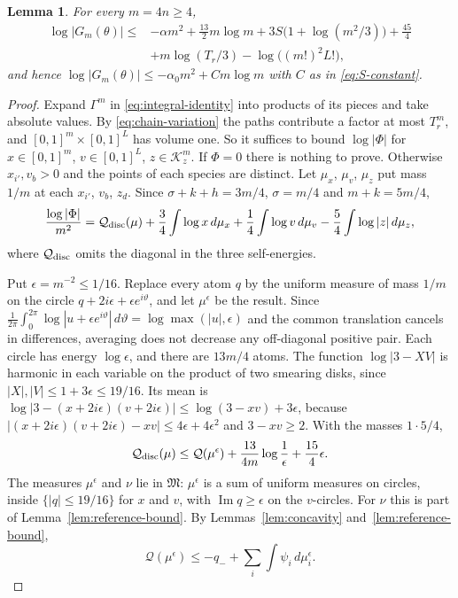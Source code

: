 \documentclass{amsart}
\newtheorem{lemma}{Lemma}[section]
\numberwithin{equation}{section}
\numberwithin{table}{section}
\begin{document}
\begin{lemma}\label{lem:analytic-bound}
For every $m=4n\ge4$,
\begin{equation}\label{eq:analytic-full}
\begin{split}
 \log|G_m(\theta)|\le{}&-\alpha m^2+\tfrac{13}{2}m\log m
   +3S\bigl(1+\log(m^2/3)\bigr)+\tfrac{45}{4}\\
  &+m\log(T_r/3)-\log\bigl((m!)^2L!\bigr),
\end{split}
\end{equation}
and hence $\log|G_m(\theta)|\le-\alpha_0m^2+Cm\log m$ with $C$ as in
\eqref{eq:S-constant}.
\end{lemma}
\begin{proof}
Expand $\Gamma^m$ in \eqref{eq:integral-identity} into products of its
pieces and take absolute values. By \eqref{eq:chain-variation} the paths
contribute a factor at most $T_r^m$, and $[0,1]^m\times[0,1]^L$ has volume
one. So it suffices to bound $\log|\Phi|$ for $x\in[0,1]^m$,
$v\in[0,1]^L$, $z\in\mathcal K_z^m$. If $\Phi=0$ there is nothing to
prove. Otherwise $x_{i'},v_b>0$ and the points of each species are distinct.
Let $\mu_x$, $\mu_v$, $\mu_z$ put mass $1/m$ at each $x_{i'}$, $v_b$, $z_d$. Since
$\sigma+k+h=3m/4$, $\sigma=m/4$ and $m+k=5m/4$,
\begin{equation}\label{eq:energy-form}
 \frac{\log|\Phi|}{m^2}=\mathcal Q_{\rm disc}(\mu)
 +\frac34\int\log x\,d\mu_x+\frac14\int\log v\,d\mu_v
 -\frac54\int\log|z|\,d\mu_z,
\end{equation}
where $\mathcal Q_{\rm disc}$ omits the diagonal in the three self-energies.

Put $\epsilon=m^{-2}\le1/16$. Replace every atom $q$ by the uniform measure
of mass $1/m$ on the circle $q+2i\epsilon+\epsilon e^{i\vartheta}$, and let
$\mu^\epsilon$ be the result. Since
$\frac1{2\pi}\int_0^{2\pi}\log|u+\epsilon e^{i\vartheta}|\,d\vartheta
=\log\max(|u|,\epsilon)$ and the common translation cancels in
differences, averaging does not decrease any off-diagonal positive pair. Each
circle has energy $\log\epsilon$, and there are $13m/4$ atoms. The
function $\log|3-XV|$ is harmonic in each variable on the product of two
smearing disks, since $|X|,|V|\le1+3\epsilon\le19/16$. Its mean is
$\log|3-(x+2i\epsilon)(v+2i\epsilon)|\le\log(3-xv)+3\epsilon$, because
$|(x+2i\epsilon)(v+2i\epsilon)-xv|\le4\epsilon+4\epsilon^2$ and $3-xv\ge2$.
With the masses $1\cdot5/4$,
\begin{equation}\label{eq:smoothing}
 \mathcal Q_{\rm disc}(\mu)\le\mathcal Q(\mu^\epsilon)
 +\frac{13}{4m}\log\frac1\epsilon+\frac{15}4\epsilon.
\end{equation}
The measures $\mu^\epsilon$ and $\nu$ lie in $\mathfrak M$: $\mu^\epsilon$
is a sum of uniform measures on circles, inside $\{|q|\le19/16\}$ for $x$
and $v$, with $\operatorname{Im}q\ge\epsilon$ on the $v$-circles. For $\nu$
this is part of Lemma~\ref{lem:reference-bound}. By Lemmas~\ref{lem:concavity}
and~\ref{lem:reference-bound},
\[
 \mathcal Q(\mu^\epsilon)\le-q_-+\sum_{i}\int\psi_i\,d\mu_i^\epsilon.
\]


\end{proof}
\end{document}
